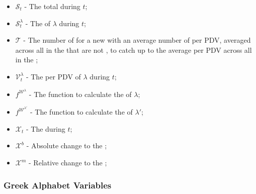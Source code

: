 \documentclass[class=article, crop=false]{standalone}
\begin{document}
\begin{itemize}[topsep=0pt, itemsep=2pt,leftmargin=16pt]
    \item[] $\mathscr{S}_{t}$ - The total  during $t$;
    \item[] $\mathscr{S}_{t}^{\lambda}$ - The  of $\lambda$ during $t$;
    \item[] $\mathscr{T}$ - The number of  for a new  with an average number of  per PDV, averaged across all  in the  that are not , to catch up to the average  per PDV across all  in the ;
    \item[] $\mathscr{V}_{t}^{\lambda}$ - The  per PDV of $\lambda$ during $t$;
    \item[] $f^{\mathscr{W}^{\lambda}}$ - The function to calculate the  of $\lambda$;
    \item[] $f^{\mathscr{W}^{\lambda'}}$ - The function to calculate the  of $\lambda'$;
    \item[] $\mathscr{X}_{t}$ - The  during $t$;
    \item[] $\mathscr{X}^{b}$ - Absolute change to the ;
    \item[] $\mathscr{X}^{m}$ - Relative change to the ;
\end{itemize}


\subsubsection{Greek Alphabet Variables}
\end{document}
